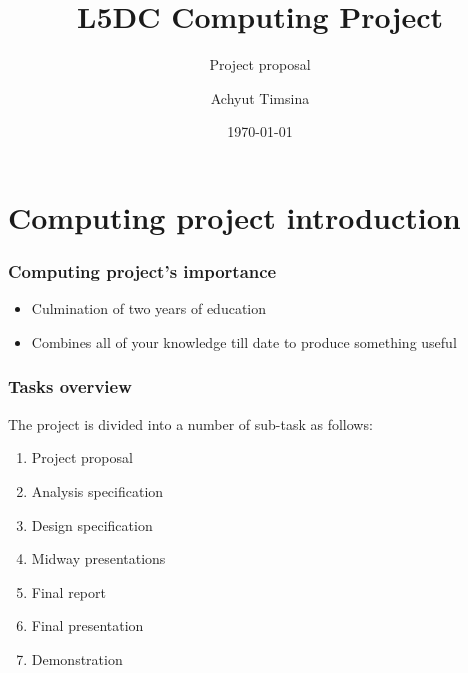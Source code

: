 \documentclass{beamer}
\title[CP]{L5DC Computing Project}
\subtitle{Project proposal}
\author{Achyut Timsina}
\date{\today}
\institute[Softwarica]{Softwarica college of IT \& E-Commerce\\
Kathmandu, Nepal\\
\url{actimsina@gmail.com}
}
\begin{document}
\maketitle

\section{Computing project introduction} %
\label{sec:computing_project_introduction}

\begin{frame}[t]\frametitle{Computing project's importance}
\begin{itemize}
    \item Culmination of two years of education
    \item Combines all of your knowledge till date to produce something useful 
\end{itemize}
\end{frame}

\begin{frame}[t]\frametitle{Tasks overview}
The project is divided into a number of sub-task as follows:
\begin{enumerate}
    \item Project proposal
    \item Analysis specification
    \item Design specification
    \item Midway presentations
    \item Final report
    \item Final presentation 
    \item Demonstration
\end{enumerate}
\end{frame}
\end{document}
